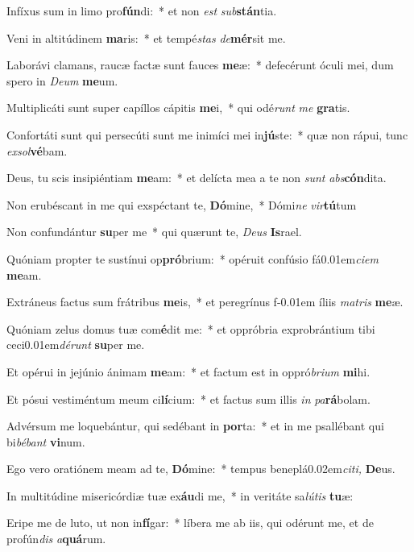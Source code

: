 \item Infíxus sum in limo pro\textbf{fún}di:~* et non \textit{est} \textit{sub}\textbf{stán}tia.
\item Veni in altitúdinem \textbf{ma}ris:~* et tempé\textit{stas} \textit{de}\textbf{mér}sit me.
\item Laborávi clamans, raucæ factæ sunt fauces \textbf{me}æ:~* defecérunt óculi mei, dum spero in \textit{Deum} \textbf{me}um.
\item Multiplicáti sunt super capíllos cápitis \textbf{me}i,~* qui odé\textit{runt} \textit{me} \textbf{gra}tis.
\item Confortáti sunt qui persecúti sunt me inimíci mei in\textbf{jú}ste:~* quæ non rápui, tunc \textit{exsol}\textbf{vé}bam.
\item Deus, tu scis insipiéntiam \textbf{me}am:~* et delícta mea a te non \textit{sunt} \textit{abs}\textbf{cón}dita.
\item Non erubéscant in me qui exspéctant te, \textbf{Dó}mine,~* Dómi\textit{ne} \textit{vir}\textbf{tú}tum
\item Non confundántur \textbf{su}per me~* qui quærunt te, \textit{Deus} \textbf{Is}rael.
\item Quóniam propter te sustínui op\textbf{pró}brium:~* opéruit confúsio fá\kern 0.01em\textit{ciem} \textbf{me}am.
\item Extráneus factus sum frátribus \textbf{me}is,~* et peregrínus f\kern -0.01em íliis \textit{matris} \textbf{me}æ.
\item Quóniam zelus domus tuæ com\textbf{é}dit me:~* et oppróbria exprobrántium tibi ceci\kern 0.01em\textit{dérunt} \textbf{su}per me.
\item Et opérui in jejúnio ánimam \textbf{me}am:~* et factum est in oppró\textit{brium} \textbf{mi}hi.
\item Et pósui vestiméntum meum ci\textbf{lí}cium:~* et factus sum illis \textit{in} \textit{pa}\textbf{rá}bolam.
\item Advérsum me loquebántur, qui sedébant in \textbf{por}ta:~* et in me psallébant qui bi\textit{bébant} \textbf{vi}num.
\item Ego vero oratiónem meam ad te, \textbf{Dó}mine:~* tempus beneplá\kern 0.02em\textit{citi,} \textbf{De}us.
\item In multitúdine misericórdiæ tuæ ex\textbf{áu}di me,~* in veritáte sa\textit{lútis} \textbf{tu}æ:
\item Eripe me de luto, ut non in\textbf{fí}gar:~* líbera me ab iis, qui odérunt me, et de profún\textit{dis} \textit{a}\textbf{quá}rum.
